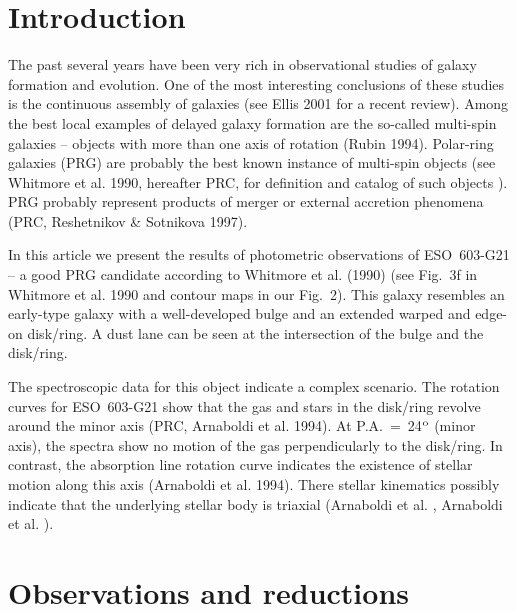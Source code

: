 \documentclass{aa}
\begin{document}



\section{Introduction}

The past several years have been very rich in observational studies of
galaxy   formation  and   evolution.  One  of  the  most   interesting
conclusions  of these studies is the  continuous  assembly of galaxies
(see Ellis 2001 for a recent  review).  Among the best local  examples
of delayed galaxy formation are the so-called  multi-spin  galaxies --
objects with more than one axis of rotation  (Rubin 1994).  Polar-ring
galaxies  (PRG) are  probably  the best known  instance of  multi-spin
objects (see Whitmore et al.  1990,  hereafter PRC, for definition and
catalog of such objects ).  PRG probably represent  products of merger
or external accretion phenomena (PRC, Reshetnikov \& Sotnikova 1997).

In this article we present the results of photometric  observations of
ESO~603-G21  -- a good PRG  candidate  according  to  Whitmore  et al.
(1990) (see Fig.~3f in Whitmore et al.  1990 and contour maps  in
our  Fig.~2). This galaxy  resembles  an  early-type
galaxy with a well-developed  bulge and an extended warped and edge-on
disk/ring.  A dust lane can be seen at the  intersection  of the bulge
and the disk/ring.


The  spectroscopic  data for this object indicate a complex  scenario.
The rotation curves for \mbox{ESO~603-G21} show that the gas and stars
in the disk/ring  revolve around the minor axis (PRC, Arnaboldi et al.
1994).  At  P.A.~=~24$^{\rm  o}$ (minor  axis),  the  spectra  show no
motion of the gas  perpendicularly to the disk/ring.  In contrast, the
absorption  line rotation  curve  indicates  the  existence of stellar
motion  along  this  axis   (Arnaboldi  et  al.  1994).  There  stellar
kinematics  possibly  indicate  that the  underlying  stellar body is
triaxial (Arnaboldi et al.  \cite{a1}, Arnaboldi et al.  \cite{a}).

\section{Observations and reductions}
\end{document}
